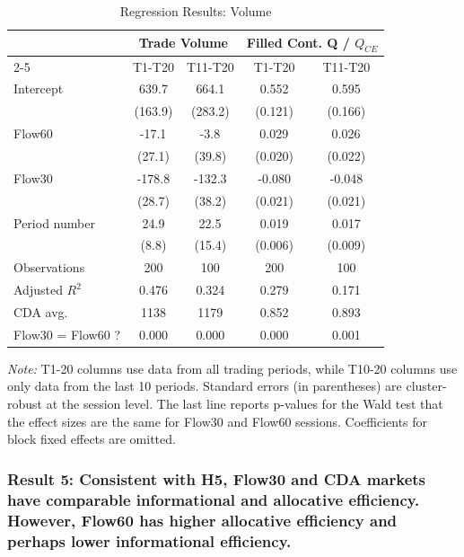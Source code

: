 \documentclass[12pt]{article}
\begin{document}
\begin{table}
\centering    
\caption{Regression Results: Volume}
\begin{threeparttable}
\begin{tabular}{@{\extracolsep{5pt}}lcccc}
\toprule
& \multicolumn{2}{c}{Trade Volume} & \multicolumn{2}{c}{Filled Cont. Q / $Q_{CE}$} \\
\cmidrule{2-5}
& T1-T20 & T11-T20 & T1-T20 & T11-T20 \\
\midrule
Intercept & 639.7$ $ & 664.1$ $ & 0.552$ $ & 0.595$ $ \\
  & (163.9) & (283.2) & (0.121) & (0.166) \\
Flow60 & -17.1$^{}$ & -3.8$^{}$ & 0.029$^{}$ & 0.026$^{}$ \\
  & (27.1) & (39.8) & (0.020) & (0.022) \\
Flow30 & -178.8$ $ & -132.3$ $ & -0.080$ $ & -0.048$ $ \\
  & (28.7) & (38.2) & (0.021) & (0.021) \\
Period number & 24.9$ $ & 22.5$^{}$ & 0.019$ $ & 0.017$ $ \\
  & (8.8) & (15.4) & (0.006) & (0.009) \\
\midrule
Observations & 200 & 100 & 200 & 100 \\
Adjusted $R^2$ & 0.476 & 0.324 & 0.279 & 0.171 \\
\midrule
CDA avg. & 1138 & 1179 & 0.852 & 0.893 \\
Flow30 = Flow60 ? & 0.000 & 0.000 & 0.000 & 0.001 \\
\bottomrule
\end{tabular}
\begin{tablenotes}[para]
\footnotesize
\textit{Note:} T1-20 columns use data from all trading periods, while T10-20 columns use only data from the last 10 periods.
Standard errors (in parentheses) are cluster-robust at the session level. 
The last line reports p-values for the Wald test that the effect sizes are the same for Flow30 and Flow60 sessions.
Coefficients for block fixed effects are omitted. 
\end{tablenotes}
\end{threeparttable}
\label{tab:Volume}
\end{table}

\subsubsection*{Result 5: Consistent with H5, Flow30 and CDA markets have comparable  informational and allocative efficiency. However, Flow60 has higher allocative efficiency and perhaps lower informational efficiency.}
\end{document}
